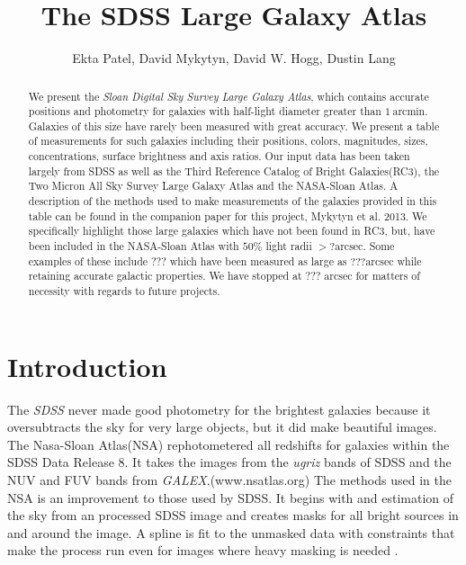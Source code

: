 \documentclass[12pt,preprint,pdftex]{aastex}
\newcounter{address}
\newcommand{\project}[1]{\textsl{#1}}
\newcommand{\units}[1]{\mathrm{#1}}
\renewcommand{\arcmin}{\units{arcmin}}
\renewcommand{\arcsec}{\units{arcsec}}
\begin{document}
\title{
       The SDSS Large Galaxy Atlas
      }
\author{
        Ekta Patel\altaffilmark{\ref{CCPP}},
        David Mykytyn\altaffilmark{\ref{CCPP}},
        David W. Hogg\altaffilmark{\ref{CCPP},\ref{MPIA},\ref{email}},
        Dustin Lang\altaffilmark{\ref{CMU}}
       }
\setcounter{address}{1}

\begin{abstract}
We present the \project{Sloan Digital Sky Survey Large Galaxy Atlas}, which contains
accurate positions and photometry for galaxies with half-light diameter
greater than $1~\arcmin$. Galaxies of this size have rarely been measured with great accuracy. We present a table of measurements for such galaxies including their positions, colors, magnitudes, sizes, concentrations, surface brightness and axis ratios. Our input data has been taken largely from SDSS as well as the Third Reference Catalog of Bright Galaxies(RC3), the Two Micron All Sky Survey Large Galaxy Atlas and the NASA-Sloan Atlas. A description of the methods used to make measurements of the galaxies provided in this table can be found in the companion paper for this project, Mykytyn et al. 2013. We specifically highlight those large galaxies which have not been found in RC3, but, have been included in the NASA-Sloan Atlas with $50\%$ light radii $>? \arcsec$. Some examples of these include ??? which have been measured as large as $???\arcsec$ while retaining accurate galactic properties. We have stopped at ??? $\arcsec$ for matters of necessity with regards to future projects.

\end{abstract}

\section{Introduction}

The \project{SDSS} never made good photometry for the brightest galaxies because it oversubtracts the sky for very large objects, but it did make beautiful images. The Nasa-Sloan Atlas(NSA) rephotometered all redshifts for galaxies within the SDSS Data Release 8. It takes the images from the \textit{ugriz} bands of SDSS and the NUV and FUV bands from \textit{GALEX}.(www.nsatlas.org) The methods used in the NSA is an improvement to those used by SDSS. It begins with and estimation of the sky from an processed SDSS image and creates masks for all bright sources in and around the image. A spline is fit to the unmasked data with constraints that make the process run even for images where heavy masking is needed \citep{blanton11}. 
\end{document}
